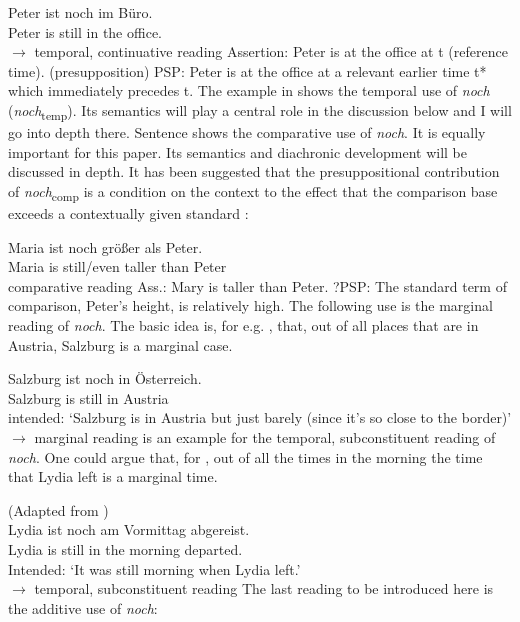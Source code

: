 \documentclass[output=paper]{langsci/langscibook}
\begin{document}
\ea\gll Peter ist noch im Büro.\\
        Peter is still {in the} office.\\
 \hfill $\rightarrow$ temporal, continuative reading \label{NOCH_TEMP_cont_EXP}
\ex\ea Assertion: Peter is at the office at t (reference time).
\ex      (presupposition) PSP: Peter is at the office at a relevant earlier time t* which immediately precedes t.
\z\z
The example in  shows the temporal use of \textit{noch} (\textit{noch}\textsubscript{temp}). Its semantics will play a central role in the discussion below and I will go into depth there. Sentence  shows the comparative use of \textit{noch}. It is equally important for this paper. Its semantics and diachronic development will be discussed in depth. It has been suggested that the presuppositional contribution of \textit{noch}\textsubscript{comp} is a condition on the context to the effect that the comparison base exceeds a contextually given standard \citep[e.g.][]{Hofstetter2013}:

\ea\gll Maria ist noch größer als Peter.\\
       Maria is still/even taller than Peter\\
 \hfill comparative reading \label{NOCH_COMP_EXP_0}
\ex\ea Ass.: Mary is taller than Peter.
\ex    ?PSP: The standard term of comparison, Peter's height, is relatively high.
\z\z
The following use is the marginal reading of \textit{noch}. The basic idea is, for e.g. , that, out of all places that are in Austria, Salzburg is a marginal case.

\ea\gll Salzburg ist noch in Österreich.\\
       Salzburg is still in Austria \\
\glt   intended: {`Salzburg is in Austria but just barely (since it's so close to the border)'} \hfill $\rightarrow$ marginal reading \label{NOCH_MARG_deg_EXP}
\z
{} is an example for the temporal, subconstituent reading of \textit{noch}. One could argue that, for , out of all the times in the morning the time that Lydia left is a marginal time.

\ea (Adapted from \citealt[ex. 27--28]{beck2016a_sub})\\
\gll Lydia ist noch am Vormittag abgereist.\\
       Lydia is still {in the} morning departed.\\
\glt   Intended: {`It was still morning when Lydia left.'} \\ \hfill $\rightarrow$ temporal, subconstituent reading \label{NOCH_TEMP_subconst_EXP}
\z
The last reading to be introduced here is the additive use of \textit{noch}:
\end{document}
